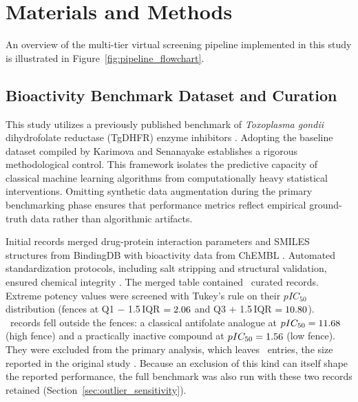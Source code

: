 \section{Materials and Methods}


An overview of the multi-tier virtual screening pipeline implemented in this study is illustrated in Figure~\ref{fig:pipeline_flowchart}.


\subsection{Bioactivity Benchmark Dataset and Curation}
\label{sec:materials_curation}

This study utilizes a previously published benchmark of \textit{Toxoplasma gondii} dihydrofolate reductase (TgDHFR) enzyme inhibitors \cite{karimova2025}. Adopting the baseline dataset compiled by Karimova and Senanayake establishes a rigorous methodological control. This framework isolates the predictive capacity of classical machine learning algorithms from computationally heavy statistical interventions. Omitting synthetic data augmentation during the primary benchmarking phase ensures that performance metrics reflect empirical ground-truth data rather than algorithmic artifacts.

Initial records merged drug-protein interaction parameters and SMILES structures from BindingDB with bioactivity data from ChEMBL \cite{karimova2025}. Automated standardization protocols, including salt stripping and structural validation, ensured chemical integrity \cite{damilola2025}. The merged table contained \DataNRaw\ curated records. Extreme potency values were screened with Tukey's rule on their $pIC_{50}$ distribution (fences at Q1 $-$ 1.5\,IQR $= 2.06$ and Q3 $+$ 1.5\,IQR $= 10.80$). \DataNOutliers\ records fell outside the fences: a classical antifolate analogue at $pIC_{50} = 11.68$ (high fence) and a practically inactive compound at $pIC_{50} = 1.56$ (low fence). They were excluded from the primary analysis, which leaves \DataNAfterOutliers\ entries, the size reported in the original study \cite{karimova2025}. Because an exclusion of this kind can itself shape the reported performance, the full benchmark was also run with these two records retained (Section~\ref{sec:outlier_sensitivity}).


